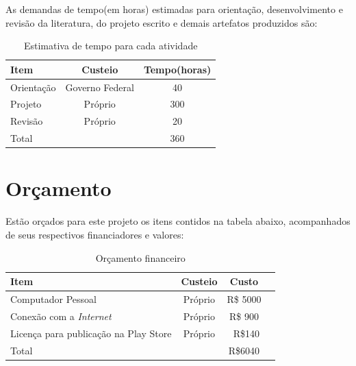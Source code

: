 \documentclass[
	12pt,				    %
	openright,			    %
	oneside,			    %
	a4paper,			    %
    sumario=tradicional,    %
	english,			    %
	brazil,				    %
	]{abntex2}              %
\begin{document}
As demandas de tempo(em horas) estimadas para orientação, desenvolvimento e revisão da literatura, do projeto escrito e demais artefatos produzidos são:

\par

\begin{table}[htpb]
	\centering
	\caption[Cronograma em horas]{Estimativa de tempo para cada atividade}
	\label{tab:cronogramaHoras}
	\begin{tabular}{lcc}
		\toprule
		\textbf{Item} & \textbf{Custeio} & \textbf{Tempo(horas)} \\
		\midrule
		Orientação    & Governo Federal  & 40                    \\
		Projeto       & Próprio          & 300                   \\
		Revisão       & Próprio          & 20                    \\
		\bottomrule
		Total         &                  & 360
	\end{tabular}
\end{table}

\chapter{Orçamento}\label{sec:orcamento}

Estão orçados para este projeto os itens contidos na tabela abaixo, acompanhados de seus respectivos financiadores e valores:

\par

\begin{table}[htpb]
	\centering
	\caption[Orçamento]{Orçamento financeiro}
	\label{tab:orcamento}
	\begin{tabular}{lccc}
		\toprule
		\textbf{Item}                         & \textbf{Custeio} & \textbf{Custo} \\
		\midrule
		Computador Pessoal                    & Próprio          & R\$ 5000       \\
		Conexão com a \textit{Internet}       & Próprio          & R\$ 900        \\
		Licença para publicação na Play Store & Próprio          & ~R\$140        \\
		\bottomrule
		Total                                 &                  & R\$6040        \\
	\end{tabular}%
\end{table}%
\end{document}

